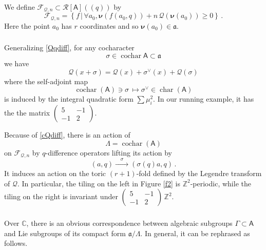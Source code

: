 \documentclass[14pt]{extarticle}
\newcommand{\C}{\mathbb{C}}
\newcommand{\Z}{\mathbb{Z}}
\newcommand{\bA}{\mathsf{A}}
\newcommand{\cR}{\mathscr{R}}
\newcommand{\cQ}{\mathscr{Q}}
\newcommand{\cF}{\mathscr{F}}
\newcommand{\fa}{\mathfrak{a}}
\newcommand{\bnu}{\boldsymbol \nu}
\newcommand{\Fq}{(\!(q)\!)}
\DeclareMathOperator{\cochar}{cochar}
\DeclareMathOperator{\cha}{char}
\theoremstyle{definition}
\begin{document}
We define $\cF_{\cQ,n} \subset \cR[\bA]\Fq$ by 
%
\begin{equation}
\cF_{\cQ,n}= \left\{f \, \Big| \, \forall a_0,
  \bnu(f(a_0,q))+n \, \cQ \left(\bnu (a_0)\right) \ge 0\right\}
\,.\label{FQn}
\end{equation}
%
Here the point $a_0$ has $r$ coordinates and so $\bnu(a_0)\in \fa$.

\subsubsection{}

Generalizing \eqref{Qqdiff}, for any cocharacter 
$$
\sigma \in \cochar\bA \subset \fa
$$
we have
%
\begin{equation}
\cQ(x+\sigma) = \cQ(x) + \sigma^\vee(x) + \cQ(\sigma)\label{cQdiff}
\end{equation}
%
where the self-adjoint map
%
\begin{equation}
\cochar(\bA) \owns \sigma \, \mapsto \sigma^\vee \in
\cha(\bA)\label{sisidu}
\end{equation}
%
is induced by the integral quadratic form $\sum \mu_i^2$. In our
running example, it has the the matrix $
\begin{pmatrix}
5 & -1 \\ -1 & 2
\end{pmatrix}
$.


Because of \eqref{cQdiff}, there is an action of
$$
\Lambda= \cochar(\bA)
$$ on
$\cF_{\cQ,n}$ by $q$-difference operators 
lifting its action by
$$
(a,q) \xrightarrow{\quad \sigma \quad} (\sigma(q) a, q) \,. 
$$ 
It induces an action on the toric $(r+1)$-fold defined by the Legendre
transform of $\cQ$. In particular, the tiling on the left in Figure
\ref{f2} is $\Z^2$-periodic, while the tiling on the right is
invariant under $\begin{pmatrix}
5 & -1 \\ -1 & 2
\end{pmatrix} \, \Z^2$.


\subsubsection{}\label{logexp}

Over $\C$, there is an obvious correspondence between algebraic
subgroups $\Gamma\subset \bA$ and Lie subgroups of its compact form
$\fa/\Lambda$. In general, it can be rephrased as follows. 
\end{document}
